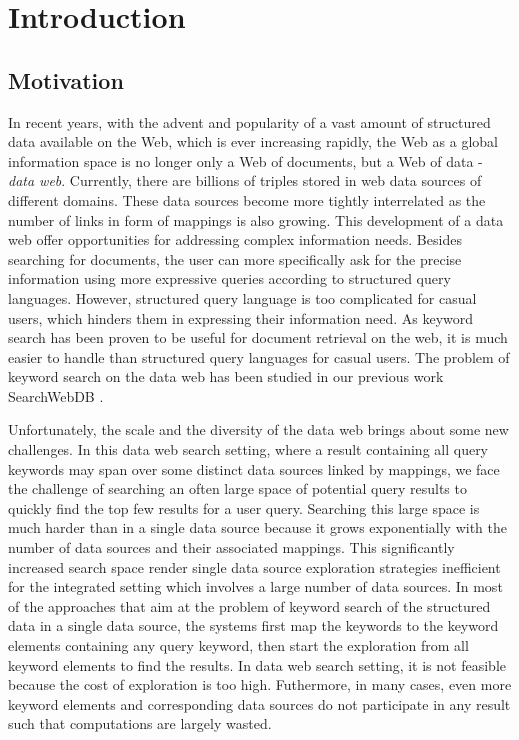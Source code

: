 \chapter{Introduction}\label{intro}

\section{Motivation}\label{intro:motivation}
In recent years, with the advent and popularity of a vast amount of structured data available on the
Web, which is ever increasing rapidly, the Web as a global information space is no longer only a Web
of documents, but a Web of data - {\em data web}. Currently, there are billions of triples stored in
web data sources of different domains. These data sources become more tightly interrelated as the
number of links in form of mappings is also growing. This development of a data web offer
opportunities for addressing complex information needs. Besides searching for documents, the user can
more specifically ask for the precise information using more expressive queries according to
structured query languages. However, structured query language is too complicated for casual users,
which hinders them in expressing their information need. As keyword search has been proven to be
useful for document retrieval on the web, it is much easier to handle than structured query languages
for casual users. The problem of keyword search on the data web has been studied in our previous work
SearchWebDB \citep{TranTR}.

Unfortunately, the scale and the diversity of the data web brings about some new challenges. In this
data web search setting, where a result containing all query keywords may span over some distinct
data sources linked by mappings, we face the challenge of searching an often large space of potential
query results to quickly find the top few results for a user query. Searching this large space is
much harder than in a single data source because it grows exponentially with the number of data
sources and their associated mappings. This significantly increased search space render single data
source exploration strategies inefficient for the integrated setting which involves a large number of
data sources. In most of the approaches that aim at the problem of keyword search of the structured
data in a single data source, the systems first map the keywords to the keyword elements containing
any query keyword, then start the exploration from all keyword elements to find the results. In data
web search setting, it is not feasible because the cost of exploration is too high. Futhermore, in
many cases, even more keyword elements and corresponding data sources do not participate in any
result such that computations are largely wasted.

